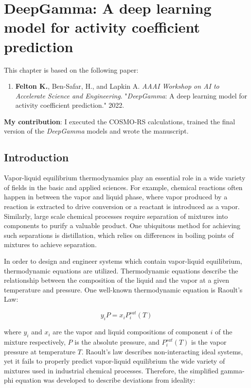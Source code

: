 \chapter{DeepGamma: A deep learning model for activity coefficient prediction}\label{ch:deep_gamma} 
This chapter is based on the following paper:
\begin{enumerate}
\item \textbf{Felton K.}, Ben-Safar, H., and Lapkin A. \textit{AAAI Workshop on AI to Accelerate Science and Engineering}. "\textit{DeepGamma}: A deep learning model for activity coefficient prediction." 2022.
\end{enumerate}
\textbf{My contribution}: I executed the COSMO-RS calculations, trained the final version of the \textit{DeepGamma} models and wrote the manuscript.

\section{Introduction}

Vapor-liquid equilibrium thermodynamics play an essential role in a wide variety of fields in the basic and applied sciences. For example, chemical reactions often happen in between the vapor and liquid phase, where vapor produced by a reaction is extracted to drive conversion or a reactant is introduced as a vapor. Similarly, large scale chemical processes require separation of mixtures into components to purify a valuable product. One ubiquitous method for achieving such separations is distillation, which relies on differences in boiling points of mixtures to achieve separation.

In order to design and engineer systems which contain vapor-liquid equilibrium, thermodynamic equations are utilized. Thermodynamic equations describe the relationship between the composition of the liquid and the vapor at a given temperature and pressure. One well-known thermodynamic equation is Raoult's Law: 

\begin{equation}
    \label{ideal-gas}
    y_i P = x_iP_i^{sat}(T)
\end{equation}

where $y_i$ and $x_i$ are the vapor and liquid compositions of component $i$ of the mixture respectively, $P$ is the absolute pressure, and $P_i^{sat}(T)$ is the vapor pressure at temperature $T$. Raoult's law describes non-interacting ideal systems, yet it fails to properly predict vapor-liquid equilibrium the wide variety of mixtures used in industrial chemical processes. Therefore, the simplified gamma-phi equation was developed to describe deviations from ideality:

